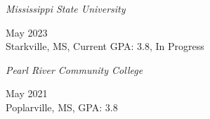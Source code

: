 
\textit{Mississippi State University}\strut \hfill May 2023\\
Starkville, MS, Current GPA: 3.8, In Progress

\textit{Pearl River Community College}\strut \hfill May 2021\\
Poplarville, MS, GPA: 3.8